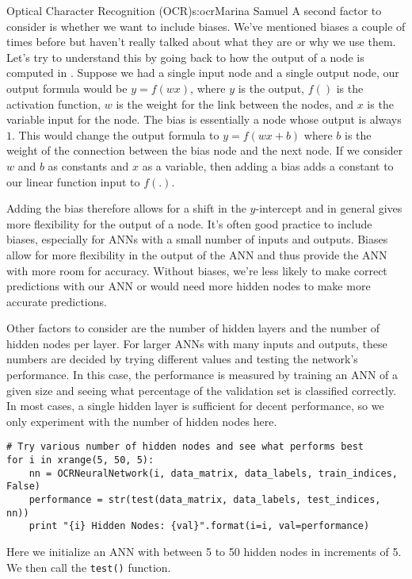 \begin{aosachapter}{Optical Character Recognition (OCR)}{s:ocr}{Marina Samuel}
A second factor to consider is whether we want to include biases. We've
mentioned biases a couple of times before but haven't really talked
about what they are or why we use them. Let's try to understand this by
going back to how the output of a node is computed in
. Suppose we had a single input node and a
single output node, our output formula would be $y = f(wx)$, where $y$
is the output, $f()$ is the activation function, $w$ is the weight for
the link between the nodes, and $x$ is the variable input for the node.
The bias is essentially a node whose output is always $1$. This would
change the output formula to $y = f(wx + b)$ where $b$ is the weight of
the connection between the bias node and the next node. If we consider
$w$ and $b$ as constants and $x$ as a variable, then adding a bias adds
a constant to our linear function input to $f(.)$.

Adding the bias therefore allows for a shift in the $y$-intercept and in
general gives more flexibility for the output of a node. It's often good
practice to include biases, especially for ANNs with a small number of
inputs and outputs. Biases allow for more flexibility in the output of
the ANN and thus provide the ANN with more room for accuracy. Without
biases, we're less likely to make correct predictions with our ANN or
would need more hidden nodes to make more accurate predictions.

Other factors to consider are the number of hidden layers and the number
of hidden nodes per layer. For larger ANNs with many inputs and outputs,
these numbers are decided by trying different values and testing the
network's performance. In this case, the performance is measured by
training an ANN of a given size and seeing what percentage of the
validation set is classified correctly. In most cases, a single hidden
layer is sufficient for decent performance, so we only experiment with
the number of hidden nodes here.

\begin{verbatim}
# Try various number of hidden nodes and see what performs best
for i in xrange(5, 50, 5):
    nn = OCRNeuralNetwork(i, data_matrix, data_labels, train_indices, False)
    performance = str(test(data_matrix, data_labels, test_indices, nn))
    print "{i} Hidden Nodes: {val}".format(i=i, val=performance)
\end{verbatim}

Here we initialize an ANN with between 5 to 50 hidden nodes in
increments of 5. We then call the \texttt{test()} function.


\end{aosachapter}
